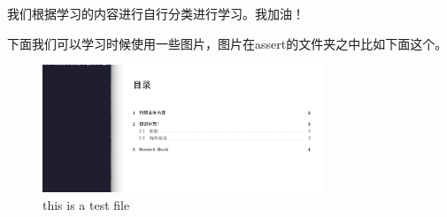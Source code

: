 我们根据学习的内容进行自行分类进行学习。我加油！

下面我们可以学习时候使用一些图片，图片在assert的文件夹之中比如下面这个。

\begin{figure}[H]
  \centering
  \includegraphics[width=0.75\textwidth]{assets/testfile.png}
  \caption{this is a test file}
  \label{fig:testfile}
\end{figure}
